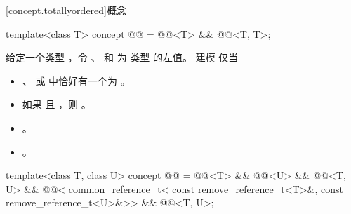 [concept.totallyordered]{概念 }

\begin{itemdecl}
template<class T>
  concept @@ =
    @@<T> && @@<T, T>;
\end{itemdecl}

\begin{itemdescr}
\pnum
给定一个类型 ，令 、 和  为
类型  的左值。
 建模  仅当

\begin{itemize}
\item {}、 或
       中恰好有一个为 。
\item 如果  且 ，则
      。
\item {}。
\item {}。
\end{itemize}

\end{itemdescr}

\begin{itemdecl}
template<class T, class U>
  concept @@ =
    @@<T> && @@<U> &&
    @@<T, U> &&
    @@<
      common_reference_t<
        const remove_reference_t<T>&,
        const remove_reference_t<U>&>> &&
    @@<T, U>;
\end{itemdecl}


